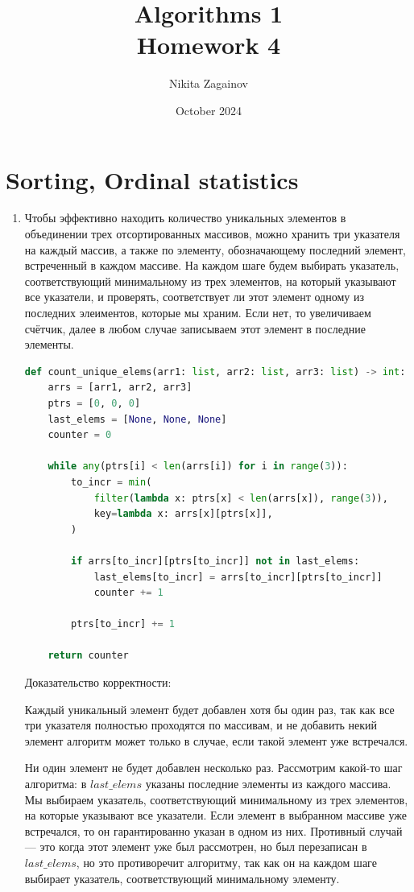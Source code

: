 \documentclass{article}
\title{Algorithms 1 \\ Homework 4}
\author{Nikita Zagainov}
\date{October 2024}  %
\begin{document}
\maketitle

\section{Sorting, Ordinal statistics}
\begin{enumerate}
    \item
          Чтобы эффективно находить количество уникальных
          элементов в объединении трех отсортированных
          массивов, можно хранить три указателя на каждый массив,
          а также по элементу, обозначающему последний элемент,
          встреченный в каждом массиве. На каждом шаге будем
          выбирать указатель, соответствующий минимальному
          из трех элементов, на который указывают все указатели,
          и проверять, соответствует ли этот элемент одному
          из последних элеиментов, которые мы храним.
          Если нет, то увеличиваем счётчик, далее в
          любом случае записываем этот элемент в последние
          элементы.

          \begin{lstlisting}[language=Python]
def count_unique_elems(arr1: list, arr2: list, arr3: list) -> int:
    arrs = [arr1, arr2, arr3]
    ptrs = [0, 0, 0]
    last_elems = [None, None, None]
    counter = 0

    while any(ptrs[i] < len(arrs[i]) for i in range(3)):
        to_incr = min(
            filter(lambda x: ptrs[x] < len(arrs[x]), range(3)),
            key=lambda x: arrs[x][ptrs[x]],
        )

        if arrs[to_incr][ptrs[to_incr]] not in last_elems:
            last_elems[to_incr] = arrs[to_incr][ptrs[to_incr]]
            counter += 1

        ptrs[to_incr] += 1

    return counter
    \end{lstlisting}

          Доказательство корректности:

          Каждый уникальный элемент будет добавлен хотя бы один раз,
          так как все три указателя полностью проходятся по
          массивам, и не добавить некий элемент алгоритм может
          только в случае, если такой элемент уже встречался.

          Ни один элемент не будет добавлен несколько раз.
          Рассмотрим какой-то шаг алгоритма:
          в $last\_elems$ указаны последние элементы из каждого
          массива. Мы выбираем указатель, соответствующий минимальному
          из трех элементов, на которые указывают все указатели.
          Если элемент в выбранном массиве уже встречался, то он
          гарантированно указан в одном из них. Противный случай ---
          это когда этот элемент уже был рассмотрен, но был перезаписан
          в $last\_elems$, но это противоречит алгоритму, так как он
          на каждом шаге выбирает указатель, соответствующий минимальному
          элементу.


\end{enumerate}
\end{document}
